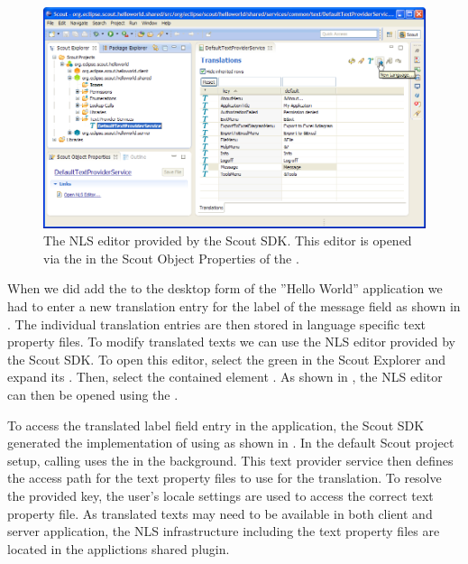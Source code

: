 \documentclass[a4paper,10pt,twoside]{book}
\begin{document}
\begin{figure}
\includegraphics[width=14cm]{sdk_nls_editor.png} 
\caption{The NLS editor provided by the Scout SDK. This editor is opened via the  in the Scout Object Properties of the .
}
\end{figure}

When we did add the  to the desktop form of the ''Hello World'' application we had to enter a new translation entry for the label of the message field as shown in .
The individual translation entries are then stored in language specific text property files.
To modify translated texts we can use the NLS editor provided by the Scout SDK.
To open this editor, select the green  in the Scout Explorer and expand its .
Then, select the contained element .
As shown in , the NLS editor can then be opened using the .

To access the translated label field entry in the application, the Scout SDK generated the implementation of  using  as shown in .
In the default Scout project setup, calling  uses the  in the background.
This text provider service then defines the access path for the text property files to use for the translation.
To resolve the provided key, the user's locale settings are used to access the correct text property file.
As translated texts may need to be available in both client and server application, the NLS infrastructure including the text property files are located in the applictions shared plugin.
\end{document}
